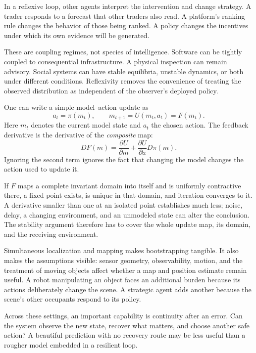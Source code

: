 \documentclass[11pt,openany]{book}
\begin{document}
In a reflexive loop, other agents interpret the intervention and change strategy. A trader responds to a forecast that other traders also read. A platform's ranking rule changes the behavior of those being ranked. A policy changes the incentives under which its own evidence will be generated.

These are coupling regimes, not species of intelligence. Software can be tightly coupled to consequential infrastructure. A physical inspection can remain advisory. Social systems can have stable equilibria, unstable dynamics, or both under different conditions. Reflexivity removes the convenience of treating the observed distribution as independent of the observer's deployed policy.

One can write a simple model--action update as
\begin{equation}
 a_t=\pi(m_t),\qquad
 m_{t+1}=U(m_t,a_t)=F(m_t).
\end{equation}
Here $m_t$ denotes the current model state and $a_t$ the chosen action. The feedback derivative is the derivative of the \emph{composite} map:
\begin{equation}
 DF(m)=
 \frac{\partial U}{\partial m}
 +\frac{\partial U}{\partial a}D\pi(m).
\end{equation}
Ignoring the second term ignores the fact that changing the model changes the action used to update it.

If $F$ maps a complete invariant domain into itself and is uniformly contractive there, a fixed point exists, is unique in that domain, and iteration converges to it. A derivative smaller than one at an isolated point establishes much less; noise, delay, a changing environment, and an unmodeled state can alter the conclusion. The stability argument therefore has to cover the whole update map, its domain, and the receiving environment.

Simultaneous localization and mapping makes bootstrapping tangible. It also makes the assumptions visible: sensor geometry, observability, motion, and the treatment of moving objects affect whether a map and position estimate remain useful. A robot manipulating an object faces an additional burden because its actions deliberately change the scene. A strategic agent adds another because the scene's other occupants respond to its policy.

Across these settings, an important capability is continuity after an error. Can the system observe the new state, recover what matters, and choose another safe action? A beautiful prediction with no recovery route may be less useful than a rougher model embedded in a resilient loop.
\end{document}
